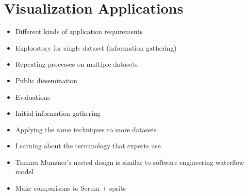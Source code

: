 \chapter{Visualization Applications}
\label{ch:visapp}

\begin{itemize}
\item Different kinds of application requirements
\item Exploratory for single dataset (information gathering)
\item Repeating processes on multiple datasets
\item Public dissemination
\item Evaluations
\end{itemize}

\begin{itemize}
\item Initial information gathering
\item Applying the same techniques to more datasets
\item Learning about the terminology that experts use
\end{itemize}

\begin{itemize}
\item Tamara Munzner's nested design is similar to software engineering waterflow model
\item Make comparisons to Scrum + sprits

\end{itemize}